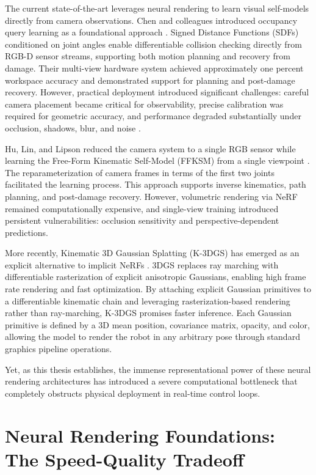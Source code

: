 \documentclass[12pt,a4paper,oneside]{report}
\begin{document}
The current state-of-the-art leverages neural rendering to learn visual self-models directly from camera observations. Chen and colleagues introduced occupancy query learning as a foundational approach \cite{chen2022full}. Signed Distance Functions (SDFs) conditioned on joint angles enable differentiable collision checking directly from RGB-D sensor streams, supporting both motion planning and recovery from damage. Their multi-view hardware system achieved approximately one percent workspace accuracy and demonstrated support for planning and post-damage recovery. However, practical deployment introduced significant challenges: careful camera placement became critical for observability, precise calibration was required for geometric accuracy, and performance degraded substantially under occlusion, shadows, blur, and noise \cite{chen2022full}.

Hu, Lin, and Lipson reduced the camera system to a single RGB sensor while learning the Free-Form Kinematic Self-Model (FFKSM) from a single viewpoint \cite{hu2024teaching}. The reparameterization of camera frames in terms of the first two joints facilitated the learning process. This approach supports inverse kinematics, path planning, and post-damage recovery. However, volumetric rendering via NeRF remained computationally expensive, and single-view training introduced persistent vulnerabilities: occlusion sensitivity and perspective-dependent predictions.

More recently, Kinematic 3D Gaussian Splatting (K-3DGS) has emerged as an explicit alternative to implicit NeRFs \cite{hu2025learning}. 3DGS replaces ray marching with differentiable rasterization of explicit anisotropic Gaussians, enabling high frame rate rendering and fast optimization. By attaching explicit Gaussian primitives to a differentiable kinematic chain and leveraging rasterization-based rendering rather than ray-marching, K-3DGS promises faster inference. Each Gaussian primitive is defined by a 3D mean position, covariance matrix, opacity, and color, allowing the model to render the robot in any arbitrary pose through standard graphics pipeline operations.

Yet, as this thesis establishes, the immense representational power of these neural rendering architectures has introduced a severe computational bottleneck that completely obstructs physical deployment in real-time control loops.

\section{Neural Rendering Foundations: The Speed-Quality Tradeoff}
\end{document}
